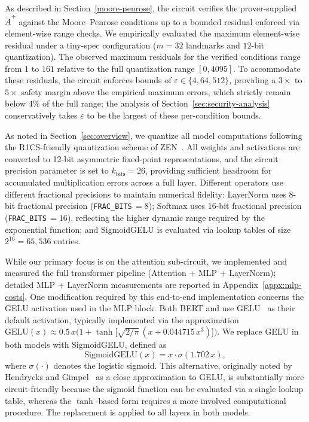 \documentclass[sigconf,anonymous,review,balance=false]{acmart}
\newcommand{\rev}[1]{{\color{magenta}#1}}
\begin{document}
\label{subsec:pseudoinverse}
As described in Section~\ref{moore-penrose}, the circuit verifies the prover-supplied $\tilde{A}^{+}$ against the Moore--Penrose conditions up to a bounded residual enforced via element-wise range checks.
We empirically evaluated the maximum element-wise residual under a tiny-spec configuration ($m{=}32$ landmarks and $12$-bit quantization).
The observed maximum residuals for the verified conditions range from $1$ to $161$ relative to the full quantization range $[0, 4095]$.
To accommodate these residuals, the circuit enforces bounds of \rev{$\varepsilon \in \{4, 64, 512\}$}, providing a $3\times$ to $5\times$ safety margin above the empirical maximum errors, which strictly remain below $4\%$ of the full range\rev{; the analysis of Section~\ref{sec:security-analysis} conservatively takes $\varepsilon$ to be the largest of these per-condition bounds}.

\label{subsec:quantization}
\rev{As noted in Section~\ref{sec:overview}, we quantize all model computations following the R1CS-friendly quantization scheme of ZEN~\cite{ZEN}.} All weights and activations are converted to 12-bit asymmetric fixed-point representations, and the circuit precision parameter is set to $k_{\text{bits}} = 26$, providing sufficient headroom for accumulated multiplication errors across a full layer. Different operators use different fractional precisions to maintain numerical fidelity: LayerNorm uses 8-bit fractional precision (\texttt{FRAC\_BITS}$\,= 8$); Softmax uses 16-bit fractional precision (\texttt{FRAC\_BITS}$\,= 16$), reflecting the higher dynamic range required by the exponential function; and SigmoidGELU is evaluated via lookup tables of size $2^{16} = 65{,}536$ entries\rev{.}

 While our primary focus is on the attention sub-circuit, we implemented and measured the full transformer pipeline (Attention + MLP + LayerNorm); detailed MLP + LayerNorm measurements are reported in Appendix~\ref{appx:mlp-costs}. One modification required by this end-to-end implementation concerns the GELU activation used in the MLP block. Both BERT and \nystromformer use GELU~\cite{GELU} as their default activation, typically implemented via the approximation $\text{GELU}(x) \approx 0.5\,x\bigl(1 + \tanh\bigl[\sqrt{2/\pi}\,(x + 0.044715\,x^3)\bigr]\bigr)$. 
We replace GELU in both models with SigmoidGELU, defined as 
\[
    \text{SigmoidGELU}(x) = x \cdot \sigma(1.702\,x),
\]
where $\sigma(\cdot)$ denotes the logistic sigmoid. This alternative, originally noted by Hendrycks and Gimpel~\cite{GELU} as a close approximation to GELU, is substantially more circuit-friendly because the sigmoid function can be evaluated via a single lookup table, whereas the $\tanh$-based form requires a more involved computational procedure. The replacement is applied to all layers in both models.
\end{document}
